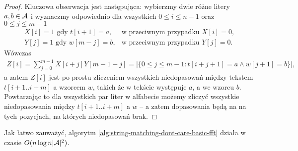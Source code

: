 \begin{proof}
Kluczowa obserwacja jest następująca: wybierzmy dwie różne litery $a, b \in \mathcal{A}$ i wyznaczmy odpowiednio dla wszystkich $0 \le i \le n - 1$ oraz $0 \le j \le m - 1$
\begin{align*}
    X[i] = \text{$1$ gdy $t[i + 1] = a$}, & \text{w przeciwnym przypadku $X[i] = 0$,} \\
    Y[j] = \text{$1$ gdy $w[m - j] = b$}, & \text{w przeciwnym przypadku $Y[j] = 0$.}
\end{align*}
Wówczas
\begin{align*}
    Z[i] = \sum_{j = 0}^{m - 1} X[i + j] Y[m - 1 - j] = |\{0 \le j \le m - 1: t[i + j + 1] = a \land w[j + 1] = b \}|,
\end{align*}
a zatem $Z[i]$ jest po prostu zliczeniem wszystkich niedopasowań między tekstem $t[i + 1..i + m]$ a wzorcem $w$,
takich że w tekście występuje $a$, a we wzorcu $b$.
Powtarzając to dla wszystkich par liter w alfabecie możemy zliczyć wszystkie niedopasowania między $t[i + 1..i + m]$ a $w$ -- a zatem dopasowania będą na na tych pozycjach, na których niedopasowań brak.
\end{proof}

Jak łatwo zauważyć, algorytm \ref{alg:string-matching-dont-care-basic-fft} działa w czasie $O(n \log{n} |\mathcal{A}|^2)$.
